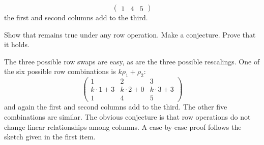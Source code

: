 \begin{exercises}
\begin{equation*}
\begin{pmatrix}
        1  &4  &5
      \end{pmatrix}
    \end{equation*}
    the first and second columns add to the third.
    \begin{exparts}
      \partsitem Show that remains true under any row operation.
      \partsitem Make a conjecture.
      \partsitem Prove that it holds.
    \end{exparts}
    \begin{answer}
      \begin{exparts}
        \partsitem The three possible row swaps are easy, 
          as are the three possible rescalings.
          One of the six possible row combinations is \( k\rho_1+\rho_2 \):
          \begin{equation*}
            \begin{pmatrix}
              1           &2           &3  \\
              k\cdot 1+3  &k\cdot 2+0  &k\cdot 3+3  \\
              1           &4           &5
            \end{pmatrix}
          \end{equation*}
          and again the first and second columns add to the third.
          The other five combinations are similar.
        \partsitem The obvious conjecture is that row operations do not change
          linear relationships among columns.
        \partsitem A case-by-case 
          proof follows the sketch given in the first item.
      \end{exparts}  
   \end{answer}
\end{exercises}
